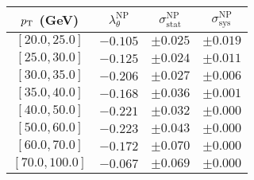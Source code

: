 \begin{tabular}{c||c||c|c}
$p_\text{T}$ (GeV) & $\lambda_\theta^{\text{NP}}$ & $\sigma_{\text{stat}}^{\text{NP}}$ & $\sigma_{\text{sys}}^{\text{NP}}$  \\
\hline
$[20.0, 25.0]$& $-0.105$ & $\pm0.025$ & $\pm0.019$\\
$[25.0, 30.0]$& $-0.125$ & $\pm0.024$ & $\pm0.011$\\
$[30.0, 35.0]$& $-0.206$ & $\pm0.027$ & $\pm0.006$\\
$[35.0, 40.0]$& $-0.168$ & $\pm0.036$ & $\pm0.001$\\
$[40.0, 50.0]$& $-0.221$ & $\pm0.032$ & $\pm0.000$\\
$[50.0, 60.0]$& $-0.223$ & $\pm0.043$ & $\pm0.000$\\
$[60.0, 70.0]$& $-0.172$ & $\pm0.070$ & $\pm0.000$\\
$[70.0, 100.0]$& $-0.067$ & $\pm0.069$ & $\pm0.000$\\
\end{tabular}
